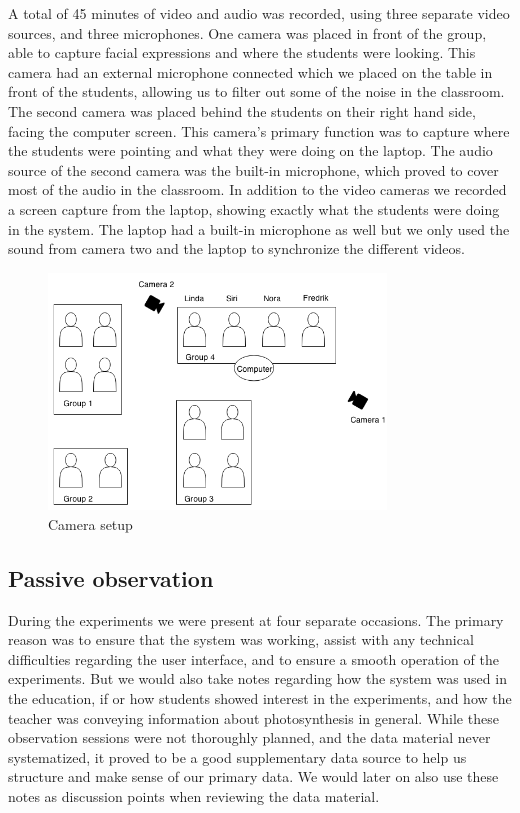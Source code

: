 A total of 45 minutes of video and audio was recorded, using three separate video sources, and three microphones. One camera was placed in front of the group, able to capture facial expressions and where the students were looking. This camera had an external microphone connected which we placed on the table in front of the students, allowing us to filter out some of the noise in the classroom. The second camera was placed behind the students on their right hand side, facing the computer screen. This camera's primary function was to capture where the students were pointing and what they were doing on the laptop. The audio source of the second camera was the built-in microphone, which proved to cover most of the audio in the classroom. In addition to the video cameras we recorded a screen capture from the laptop, showing exactly what the students were doing in the system. The laptop had a built-in microphone as well but we only used the sound from camera two and the laptop to synchronize the different videos.
\begin{figure}
\centering
\includegraphics[width=0.8\textwidth]{img/empiricalsetting/class_diagram.png}
\caption{Camera setup}
\label{fig:camerasetup}
\end{figure}

\subsection{Passive observation}
During the experiments we were present at four separate occasions. The primary reason was to ensure that the system was working, assist with any technical difficulties regarding the user interface, and to ensure a smooth operation of the experiments. But we would also take notes regarding how the system was used in the education, if or how students showed interest in the experiments, and how the teacher was conveying information about photosynthesis in general. While these observation sessions were not thoroughly planned, and the data material never systematized, it proved to be a good supplementary data source to help us structure and make sense of our primary data. We would later on also use these notes as discussion points when reviewing the data material. 

